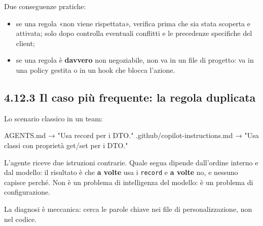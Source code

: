 \documentclass[
  italian,
  10pt,
]{book}
\newenvironment{Shaded}{\begin{snugshade}}{\end{snugshade}}
\newcommand{\AttributeTok}[1]{\textcolor[rgb]{0.13,0.29,0.53}{#1}}
\newcommand{\CommentTok}[1]{\textcolor[rgb]{0.56,0.35,0.01}{\textit{#1}}}
\newcommand{\ExtensionTok}[1]{#1}
\newcommand{\KeywordTok}[1]{\textcolor[rgb]{0.13,0.29,0.53}{\textbf{#1}}}
\newcommand{\NormalTok}[1]{#1}
\newcommand{\PreprocessorTok}[1]{\textcolor[rgb]{0.56,0.35,0.01}{\textit{#1}}}
\newcommand{\StringTok}[1]{\textcolor[rgb]{0.31,0.60,0.02}{#1}}
\newcommand{\VariableTok}[1]{\textcolor[rgb]{0.00,0.00,0.00}{#1}}
\providecommand{\tightlist}{%
  \setlength{\itemsep}{0pt}\setlength{\parskip}{0pt}}
\begin{document}
Due conseguenze pratiche:

\begin{itemize}
\tightlist
\item
  se una regola «non viene rispettata», verifica prima che sia stata
  scoperta e attivata; solo dopo controlla eventuali conflitti e le
  precedenze specifiche del client;
\item
  se una regola è \textbf{davvero} non negoziabile, non va in un file di
  progetto: va in una policy gestita o in un hook che blocca l'azione.
\end{itemize}

\subsection{4.12.3 Il caso più frequente: la regola
duplicata}\label{il-caso-piuxf9-frequente-la-regola-duplicata}

Lo scenario classico in un team:

\begin{Shaded}
\begin{Highlighting}[]
\NormalTok{AGENTS.md                      → "Usa record per i DTO."}
\NormalTok{.github/copilot{-}instructions.md → "Usa classi con proprietà get/set per i DTO."}
\end{Highlighting}
\end{Shaded}

L'agente riceve due istruzioni contrarie. Quale segua dipende
dall'ordine interno e dal modello: il risultato è che \textbf{a volte}
usa i \texttt{record} e \textbf{a volte} no, e nessuno capisce perché.
Non è un problema di intelligenza del modello: è un problema di
configurazione.

La diagnosi è meccanica: cerca le parole chiave nei file di
personalizzazione, non nel codice.

\begin{Shaded}
\end{Shaded}
\end{document}
